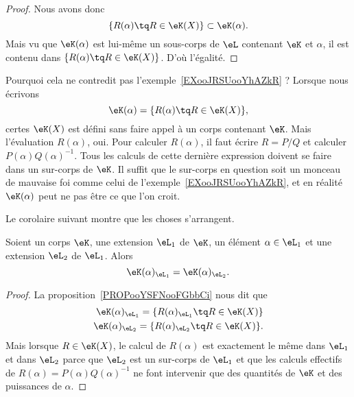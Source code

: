 \begin{proof}
    Nous avons donc
    \begin{equation}
        \{ R(\alpha)\tq R\in \eK(X) \}\subset \eK(\alpha).
    \end{equation}
    Mais vu que \( \eK(\alpha)\) est lui-même un sous-corps de \( \eL\) contenant \( \eK\) et \( \alpha\), il est contenu dans \( \{ R(\alpha)\tq R\in \eK(X) \}\). D'où l'égalité.
\end{proof}

Pourquoi cela ne contredit pas l'exemple~\ref{EXooJRSUooYhAZkR} ? Lorsque nous écrivons
\begin{equation}
    \eK(\alpha)=\{ R(\alpha)\tq R\in \eK(X) \},
\end{equation}
certes \( \eK(X)\) est défini sans faire appel à un corps contenant \( \eK\). Mais l'évaluation \( R(\alpha)\), oui. Pour calculer \( R(\alpha)\), il faut écrire \( R=P/Q\) et calculer \( P(\alpha)Q(\alpha)^{-1}\). Tous les calculs de cette dernière expression doivent se faire dans un sur-corps de \( \eK\). Il suffit que le sur-corps en question soit un monceau de mauvaise foi comme celui de l'exemple~\ref{EXooJRSUooYhAZkR}, et en réalité \( \eK(\alpha)\) peut ne pas être ce que l'on croit.

Le corolaire suivant montre que les choses s'arrangent.

\begin{corollary}
    Soient un corps \( \eK\), une extension \( \eL_1\) de \( \eK\), un élément \( \alpha\in \eL_1\) et une extension \( \eL_2\) de \( \eL_1\). Alors
    \begin{equation}
        \eK(\alpha)_{\eL_1}=\eK(\alpha)_{\eL_2}.
    \end{equation}
\end{corollary}

\begin{proof}
    La proposition~\ref{PROPooYSFNooFGbbCi} nous dit que
    \begin{subequations}
        \begin{align}
            \eK(\alpha)_{\eL_1}=\{ R(\alpha)_{\eL_1}\tq R\in\eK(X) \}\\
            \eK(\alpha)_{\eL_2}=\{ R(\alpha)_{\eL_2}\tq R\in\eK(X) \}.
        \end{align}
    \end{subequations}
    Mais lorsque \( R\in \eK(X)\), le calcul de \( R(\alpha)\) est exactement le même dans \( \eL_1\) et dans \( \eL_2\) parce que \( \eL_2\) est un sur-corps de \( \eL_1\) et que les calculs effectifs de \( R(\alpha)=P(\alpha)Q(\alpha)^{-1}\) ne font intervenir que des quantités de \( \eK\) et des puissances de \( \alpha\).
\end{proof}

